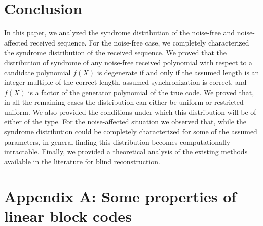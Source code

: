 \documentclass[10pt,journal]{IEEEtran}
\begin{document}


\section{Conclusion}
\label{Section_conclusion}

In this paper, we analyzed the syndrome distribution of the noise-free and
noise-affected received sequence.
%
For the noise-free case, we completely characterized the syndrome distribution of the received sequence.
We proved that the distribution of syndrome of any noise-free received polynomial with respect to a candidate polynomial $f(X)$
is degenerate if and only if the assumed length is an integer multiple of the correct length, 
assumed synchronization is correct, and $f(X)$ is a factor of the generator polynomial of the true code.
% 
We proved that, in all the remaining cases the distribution can either be
uniform or restricted uniform.
% 
We also provided the conditions under which this distribution will be of either of the type.
% 
% 
For the noise-affected situation
we observed that, while the syndrome distribution could be completely characterized 
for some of the assumed parameters, in general finding this distribution becomes computationally intractable.
%
Finally, we provided a theoretical analysis of the existing methods available in the literature for blind reconstruction.




\section*{Appendix A: Some properties of linear block codes} 
\end{document}
